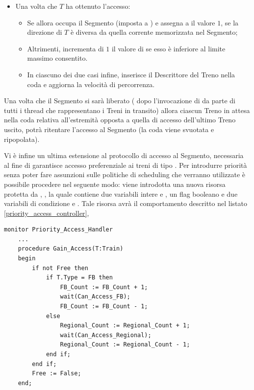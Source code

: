 \begin{description}
\begin{itemize}
\begin{lstlisting}[caption=\small{Procedura protetta \ttt{Enter\_Monitor} per l'accesso al Segmento.},label=code:segment_monitor_enter]
				((not Free) and 
				 (Access_End /= Current_Direction)) or 
				((not Free) and
				 (Access_End = Current_Direction) and 
				 (Access_Number = MAX) and 
				 (First_End_Count > 0)) loop
				wait(Can_Enter_Second_End);
			end loop;
		end if;
		// A questo punto il Treno puo' accedere.
		...
	end;
...	
end monitor;
\end{lstlisting}
			\item Una volta che $T$ ha ottenuto l'accesso:
				\begin{itemize}
					\item Se  allora occupa il Segmento (imposta  a ) e assegna a  il valore $1$, se la direzione di $T$ è diversa da quella corrente memorizzata nel Segmento;
					\item Altrimenti, incrementa di $1$ il valore di  se esso è inferiore al limite massimo consentito.
					\item In ciascuno dei due casi infine, inserisce il Descrittore del Treno nella coda  e aggiorna la velocità di percorrenza.
				\end{itemize}
		\end{itemize}
			
			Una volta che il Segmento si sarà liberato ( dopo l'invocazione di  da parte di tutti i thread che rappresentano i Treni in transito) allora ciascun Treno in attesa nella coda relativa all'estremità opposta a quella di accesso dell'ultimo Treno uscito, potrà ritentare l'accesso al Segmento (la coda viene svuotata e ripopolata).
			
			Vi è infine un ultima estensione al protocollo di accesso al Segmento, necessaria al fine di garantisce accesso preferenziale ai treni di tipo . Per introdurre priorità senza poter fare assunzioni sulle politiche di scheduling che verranno utilizzate è possibile procedere nel seguente modo: viene introdotta una nuova risorsa protetta da , , la quale contiene due variabili intere  e , un flag booleano  e due variabili di condizione  e . Tale risorsa avrà il comportamento descritto nel listato \ref{priority_access_controller},
	
\begin{lstlisting}[caption=\small{monitor utilizzato per garantire accesso preferenziale a Treni di tipo \ttt{FB}.}, label=priority_access_controller]
monitor Priority_Access_Handler 
	...
	procedure Gain_Access(T:Train) 
	begin
		if not Free then
			if T.Type = FB then
				FB_Count := FB_Count + 1;
				wait(Can_Access_FB);
				FB_Count := FB_Count - 1;
			else
				Regional_Count := Regional_Count + 1;
				wait(Can_Access_Regional);
				Regional_Count := Regional_Count - 1;
			end if;
		end if;
		Free := False;
	end;
	

\end{lstlisting}
\end{description}
